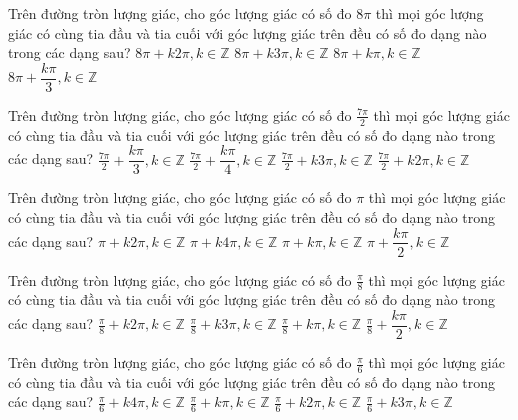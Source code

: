 \documentclass[12pt,a4paper]{article}
\begin{document}
\begin{ex}
 Trên đường tròn lượng giác, cho góc lượng giác có số đo ${8 \pi}$ thì mọi góc lượng giác có cùng tia đầu và tia cuối với góc lượng giác trên đều có số đo dạng nào trong các dạng sau? 
\choice
{ \True $8 \pi+k2\pi, k\in \mathbb{Z}$ }
   { $8 \pi+k3\pi, k\in \mathbb{Z}$ }
     { $8 \pi+k\pi, k\in \mathbb{Z}$ }
    { $8 \pi+\dfrac{k\pi }{3}, k\in \mathbb{Z}$ }
\end{ex}

\begin{ex}
 Trên đường tròn lượng giác, cho góc lượng giác có số đo ${\frac{7 \pi}{2}}$ thì mọi góc lượng giác có cùng tia đầu và tia cuối với góc lượng giác trên đều có số đo dạng nào trong các dạng sau? 
\choice
{ $\frac{7 \pi}{2}+\dfrac{k\pi }{3}, k\in \mathbb{Z}$ }
   { $\frac{7 \pi}{2}+\dfrac{k\pi }{4}, k\in \mathbb{Z}$ }
     { $\frac{7 \pi}{2}+k3\pi, k\in \mathbb{Z}$ }
    { \True $\frac{7 \pi}{2}+k2\pi, k\in \mathbb{Z}$ }
\end{ex}

\begin{ex}
 Trên đường tròn lượng giác, cho góc lượng giác có số đo ${\pi}$ thì mọi góc lượng giác có cùng tia đầu và tia cuối với góc lượng giác trên đều có số đo dạng nào trong các dạng sau? 
\choice
{ \True $\pi+k2\pi, k\in \mathbb{Z}$ }
   { $\pi+k4\pi, k\in \mathbb{Z}$ }
     { $\pi+k\pi, k\in \mathbb{Z}$ }
    { $\pi+\dfrac{k\pi }{2}, k\in \mathbb{Z}$ }
\end{ex}

\begin{ex}
 Trên đường tròn lượng giác, cho góc lượng giác có số đo ${\frac{\pi}{8}}$ thì mọi góc lượng giác có cùng tia đầu và tia cuối với góc lượng giác trên đều có số đo dạng nào trong các dạng sau? 
\choice
{ \True $\frac{\pi}{8}+k2\pi, k\in \mathbb{Z}$ }
   { $\frac{\pi}{8}+k3\pi, k\in \mathbb{Z}$ }
     { $\frac{\pi}{8}+k\pi, k\in \mathbb{Z}$ }
    { $\frac{\pi}{8}+\dfrac{k\pi }{2}, k\in \mathbb{Z}$ }
\end{ex}

\begin{ex}
 Trên đường tròn lượng giác, cho góc lượng giác có số đo ${\frac{\pi}{6}}$ thì mọi góc lượng giác có cùng tia đầu và tia cuối với góc lượng giác trên đều có số đo dạng nào trong các dạng sau? 
\choice
{ $\frac{\pi}{6}+k4\pi, k\in \mathbb{Z}$ }
   { $\frac{\pi}{6}+k\pi, k\in \mathbb{Z}$ }
     { \True $\frac{\pi}{6}+k2\pi, k\in \mathbb{Z}$ }
    { $\frac{\pi}{6}+k3\pi, k\in \mathbb{Z}$ }
\end{ex}
\end{document}
